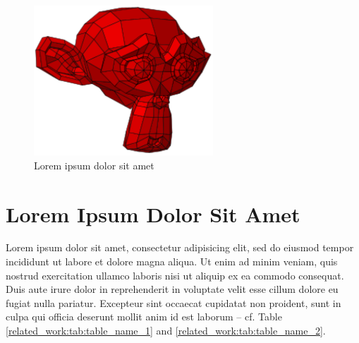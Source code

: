 \begin{figure}[h]
\centering
\includegraphics[width=0.6\textwidth]{figs/chapter2/suzanne}
\caption{Lorem ipsum dolor sit amet}
\label{related_work:fig:figure_name_1}
\end{figure}

\section{Lorem Ipsum Dolor Sit Amet}\label{related_work:sec:section_2}

Lorem ipsum dolor sit amet, consectetur adipisicing elit, sed do eiusmod tempor incididunt ut labore et dolore magna aliqua. Ut enim ad minim veniam, quis nostrud exercitation ullamco laboris nisi ut aliquip ex ea commodo consequat. Duis aute irure dolor in reprehenderit in voluptate velit esse cillum dolore eu fugiat nulla pariatur. Excepteur sint occaecat cupidatat non proident, sunt in culpa qui officia deserunt mollit anim id est laborum -- cf. Table \ref{related_work:tab:table_name_1} and \ref{related_work:tab:table_name_2}.

